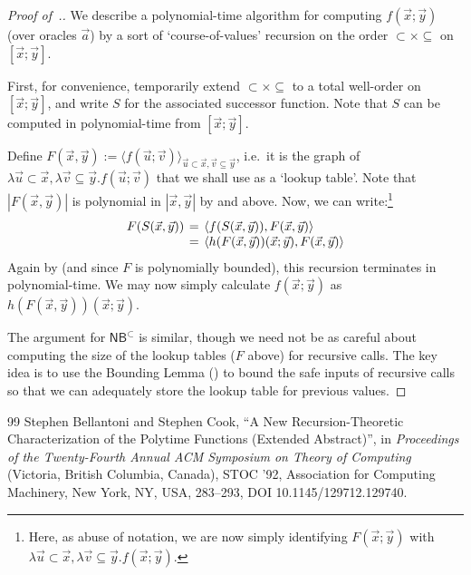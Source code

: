 \documentclass[10pt,a4paper]{amsart}
\newcommand{\dfn}{:=}
\theoremstyle{definition}
\theoremstyle{remark}
\newcommand{\permpref}{\subset}
\newcommand{\permprefeq}{\subseteq}
\newcommand{\bc}{\mathsf{B}}
\newcommand{\bcwfpo}[1]{\bc^{#1}}
\newcommand{\nested}{\mathsf{N}}
\newcommand{\nbcwfpo}[1]{\nested\bcwfpo{#1}}
\newcommand{\nbcpp}{\nbcwfpo{\permpref}}
\begin{document}
\begin{proof}[Proof of~.]
We describe a polynomial-time algorithm for computing $f(\vec x;\vec y)$ (over oracles $\vec a$) by a sort of `course-of-values' recursion on the order $\permpref \times \permprefeq $ on $[\vec x;\vec y]$.

First, for convenience, temporarily extend $\permpref \times \permprefeq$ to a total well-order on $[\vec x;\vec y]$, and write $S$ for the associated successor function.
    Note that $S$ can be computed in polynomial-time from $[\vec x;\vec y]$.


Define $F(\vec x,\vec y) \dfn \langle f(\vec u;\vec v)\rangle_{\vec u \permpref \vec x, \vec v \permprefeq \vec y}$, i.e.\ it is the graph of $\lambda \vec u \permpref \vec x, \lambda \vec v \permprefeq \vec y . f(\vec u;\vec v)$ that we shall use as a `lookup table'.
    Note that $|F(\vec x,\vec y)| $ is polynomial in $|\vec x,\vec y|$ by  and  above.
    Now, we can write:\footnote{Here, as abuse of notation, we are now simply identifying $F(\vec x;\vec y)$ with $\lambda \vec u \permpref \vec x, \lambda \vec v \permprefeq \vec y . f(\vec x;\vec y)$.}
    \[
    \arraycolsep=2pt
    \begin{array}{rcl}
        F(S(\vec x,\vec y)) & =&  \langle f(S(\vec x,\vec y)), F(\vec x,\vec y) \rangle  \\
        & = & \langle h(F(\vec x ,\vec y))(\vec x;\vec y),F(\vec x,\vec y)\rangle
    \end{array}
    \]
    Again by  (and since $F$ is polynomially bounded), this recursion terminates in polynomial-time.
    We may now simply calculate $f(\vec x;\vec y)$ as $h(F(\vec x,\vec y))(\vec x;\vec y)$.
    
The argument for $\nbcpp$ is similar, though we need not be as careful about computing the size of the lookup tables ($F$ above) for recursive calls.
The key idea is to use the Bounding Lemma () to bound the safe inputs of recursive calls so that we can adequately store the lookup table for previous values.
\end{proof}

\begin{thebibliography}{99}
 Stephen Bellantoni and Stephen Cook, ``A New Recursion-Theoretic Characterization of the Polytime Functions (Extended Abstract)'', in \emph{Proceedings of the Twenty-Fourth Annual ACM Symposium on Theory of Computing} (Victoria, British Columbia, Canada), STOC '92, Association for Computing Machinery, New York, NY, USA, 283--293, DOI 10.1145/129712.129740.
\end{thebibliography}
\end{document}
